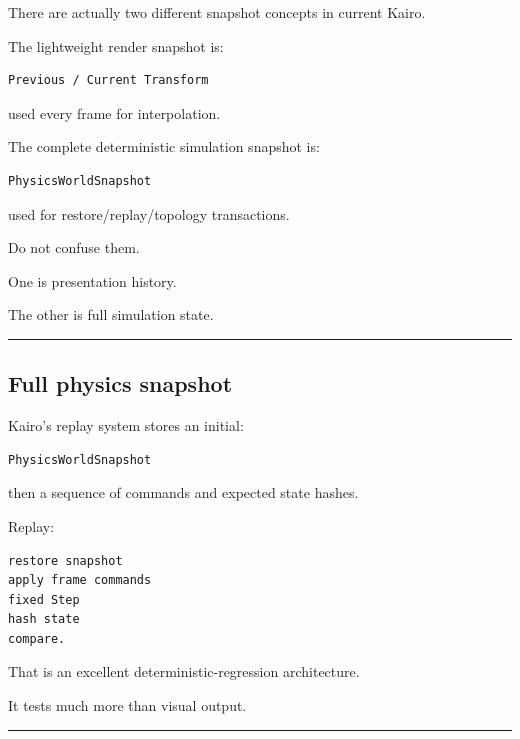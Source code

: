 \hypertarget{06-engine-ii-ch037-snapshot-has-two-meanings}{}

There are actually two different snapshot concepts in current Kairo.

The lightweight render snapshot is:

\begin{verbatim}
Previous / Current Transform
\end{verbatim}

used every frame for interpolation.

The complete deterministic simulation snapshot is:

\begin{verbatim}
PhysicsWorldSnapshot
\end{verbatim}

used for restore/replay/topology transactions.

Do not confuse them.

One is presentation history.

The other is full simulation state.

\begin{center}\rule{0.5\linewidth}{0.5pt}\end{center}

\subsection{Full physics snapshot}\label{06-engine-ii-ch037-full-physics-snapshot}

\hypertarget{06-engine-ii-ch037-full-physics-snapshot}{}

Kairo's replay system stores an initial:

\begin{verbatim}
PhysicsWorldSnapshot
\end{verbatim}

then a sequence of commands and expected state hashes.

Replay:

\begin{verbatim}
restore snapshot
apply frame commands
fixed Step
hash state
compare.
\end{verbatim}

That is an excellent deterministic-regression architecture.

It tests much more than visual output.

\begin{center}\rule{0.5\linewidth}{0.5pt}\end{center}


